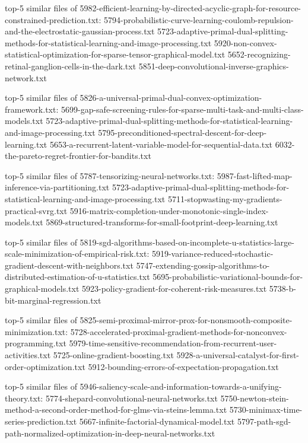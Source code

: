 \documentclass[11pt]{article}
\begin{document}
top-5 similar files of
5982-efficient-learning-by-directed-acyclic-graph-for-resource-constrained-prediction.txt:
5794-probabilistic-curve-learning-coulomb-repulsion-and-the-electrostatic-gaussian-process.txt
5723-adaptive-primal-dual-splitting-methods-for-statistical-learning-and-image-processing.txt
5920-non-convex-statistical-optimization-for-sparse-tensor-graphical-model.txt
5652-recognizing-retinal-ganglion-cells-in-the-dark.txt
5851-deep-convolutional-inverse-graphics-network.txt

top-5 similar files of
5826-a-universal-primal-dual-convex-optimization-framework.txt:
5699-gap-safe-screening-rules-for-sparse-multi-task-and-multi-class-models.txt
5723-adaptive-primal-dual-splitting-methods-for-statistical-learning-and-image-processing.txt
5795-preconditioned-spectral-descent-for-deep-learning.txt
5653-a-recurrent-latent-variable-model-for-sequential-data.txt
6032-the-pareto-regret-frontier-for-bandits.txt

top-5 similar files of 5787-tensorizing-neural-networks.txt:
5987-fast-lifted-map-inference-via-partitioning.txt
5723-adaptive-primal-dual-splitting-methods-for-statistical-learning-and-image-processing.txt
5711-stopwasting-my-gradients-practical-svrg.txt
5916-matrix-completion-under-monotonic-single-index-models.txt
5869-structured-transforms-for-small-footprint-deep-learning.txt

top-5 similar files of
5819-sgd-algorithms-based-on-incomplete-u-statistics-large-scale-minimization-of-empirical-risk.txt:
5919-variance-reduced-stochastic-gradient-descent-with-neighbors.txt
5747-extending-gossip-algorithms-to-distributed-estimation-of-u-statistics.txt
5695-probabilistic-variational-bounds-for-graphical-models.txt
5923-policy-gradient-for-coherent-risk-measures.txt
5738-b-bit-marginal-regression.txt

top-5 similar files of
5825-semi-proximal-mirror-prox-for-nonsmooth-composite-minimization.txt:
5728-accelerated-proximal-gradient-methods-for-nonconvex-programming.txt
5979-time-sensitive-recommendation-from-recurrent-user-activities.txt
5725-online-gradient-boosting.txt
5928-a-universal-catalyst-for-first-order-optimization.txt
5912-bounding-errors-of-expectation-propagation.txt

top-5 similar files of
5946-saliency-scale-and-information-towards-a-unifying-theory.txt:
5774-shepard-convolutional-neural-networks.txt
5750-newton-stein-method-a-second-order-method-for-glms-via-steins-lemma.txt
5730-minimax-time-series-prediction.txt
5667-infinite-factorial-dynamical-model.txt
5797-path-sgd-path-normalized-optimization-in-deep-neural-networks.txt
\end{document}
